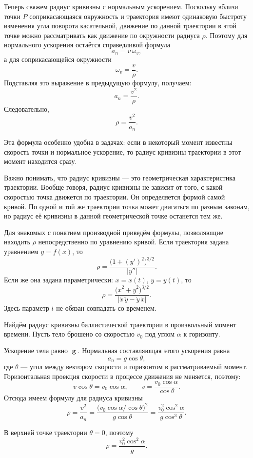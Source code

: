 \documentclass[../main.tex]{subfiles}
\begin{document}
Теперь свяжем радиус кривизны с нормальным ускорением. Поскольку вблизи точки $P$ соприкасающаяся окружность и траектория имеют
одинаковую быстроту изменения угла поворота касательной, движение по данной
траектории в этой точке можно рассматривать как движение по окружности
радиуса $\rho$. Поэтому для нормального ускорения остаётся справедливой
формула
\[
a_n = v\,\omega_v,
\]
а для соприкасающейся окружности
\[
\omega_v = \frac{v}{\rho}.
\]
Подставляя это выражение в предыдущую формулу, получаем:
\[
a_n = \frac{v^2}{\rho}.
\]
Следовательно,
\[
\rho = \frac{v^2}{a_n}.
\]

Эта формула особенно удобна в задачах: если в некоторый момент известны
скорость точки и нормальное ускорение, то радиус кривизны траектории в
этот момент находится сразу.

Важно понимать, что радиус кривизны --- это геометрическая характеристика траектории. Вообще говоря, радиус кривизны не зависит от того, с какой скоростью точка
движется по траектории. Он определяется формой самой кривой. По одной и той же
траектории точка может двигаться по разным законам, но радиус её кривизны
в данной геометрической точке останется тем же.

Для знакомых с понятием производной приведём формулы, позволяющие находить $\rho$
непосредственно по уравнению кривой. Если траектория задана уравнением
$y = f(x)$, то
\[
\rho = \frac{\bigl(1 + (y')^2\bigr)^{3/2}}{|y''|}.
\]
Если же она задана параметрически: $x = x(t)$, $y = y(t)$, то
\[
\rho = \frac{\bigl(\dot x^2 + \dot y^2\bigr)^{3/2}}{|\dot x\,\ddot y - \dot y\,\ddot x|}.
\]
Здесь параметр $t$ не обязан совпадать со временем.

\begin{example}
Найдём радиус кривизны баллистической траектории в произвольный момент
времени. Пусть тело брошено со скоростью $v_0$ под углом $\alpha$ к
горизонту.

Ускорение тела равно $\mbfg$. Нормальная составляющая этого ускорения равна
\[
a_n = g\cos\theta,
\]
где $\theta$ --- угол между вектором скорости и горизонтом в рассматриваемый
момент. Горизонтальная проекция скорости в процессе движения не меняется, поэтому:
\[
v\cos\theta = v_0\cos\alpha,
\qquad
v = \frac{v_0\cos\alpha}{\cos\theta}.
\]
Отсюда имеем формулу для радиуса кривизны
\[
\rho = \frac{v^2}{a_n}
= \frac{\bigl(v_0\cos\alpha / \cos\theta\bigr)^2}{g\cos\theta}
= \frac{v_0^2\cos^2\alpha}{g\cos^3\theta}.
\]

В верхней точке траектории $\theta = 0$, поэтому
\[
\rho = \frac{v_0^2\cos^2\alpha}{g}.
\]
\end{example}
\end{document}
